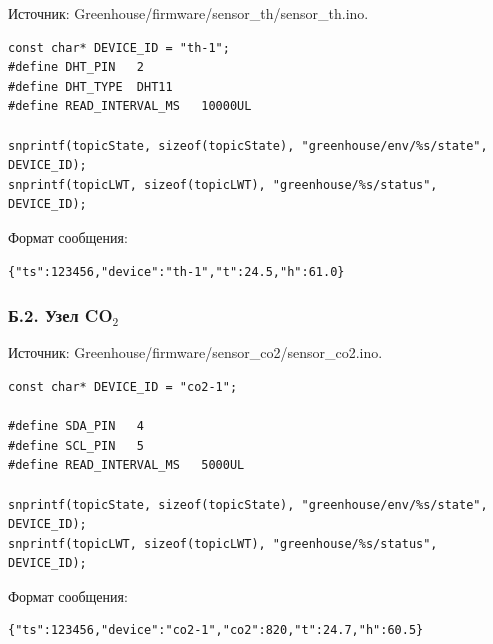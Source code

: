 \documentclass[a4paper,14pt]{extarticle}
\renewcommand{\texttt}[1]{\textnormal{#1}}
\begin{document}
Источник: \texttt{Greenhouse/firmware/sensor\_th/sensor\_th.ino}.

\par\noindent\begin{minipage}{\linewidth}
\begin{verbatim}
const char* DEVICE_ID = "th-1";
#define DHT_PIN   2
#define DHT_TYPE  DHT11
#define READ_INTERVAL_MS   10000UL

snprintf(topicState, sizeof(topicState), "greenhouse/env/%s/state", DEVICE_ID);
snprintf(topicLWT, sizeof(topicLWT), "greenhouse/%s/status", DEVICE_ID);
\end{verbatim}
\end{minipage}\par

Формат сообщения:

\par\noindent\begin{minipage}{\linewidth}
\begin{verbatim}
{"ts":123456,"device":"th-1","t":24.5,"h":61.0}
\end{verbatim}
\end{minipage}\par

\hypertarget{ux431.2.-ux443ux437ux435ux43b-co_2}{%
\subsubsection{\texorpdfstring{Б.2. Узел
CO\(_2\)}{Б.2. Узел CO\_2}}\label{ux431.2.-ux443ux437ux435ux43b-co_2}}

Источник: \texttt{Greenhouse/firmware/sensor\_co2/sensor\_co2.ino}.

\par\noindent\begin{minipage}{\linewidth}
\begin{verbatim}
const char* DEVICE_ID = "co2-1";

#define SDA_PIN   4
#define SCL_PIN   5
#define READ_INTERVAL_MS   5000UL

snprintf(topicState, sizeof(topicState), "greenhouse/env/%s/state", DEVICE_ID);
snprintf(topicLWT, sizeof(topicLWT), "greenhouse/%s/status", DEVICE_ID);
\end{verbatim}
\end{minipage}\par

Формат сообщения:

\par\noindent\begin{minipage}{\linewidth}
\begin{verbatim}
{"ts":123456,"device":"co2-1","co2":820,"t":24.7,"h":60.5}
\end{verbatim}
\end{minipage}\par
\end{document}
